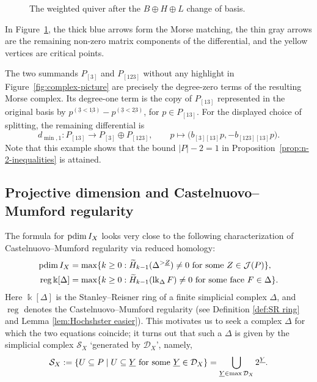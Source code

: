 \documentclass[a4paper,leqno]{amsart}
\begin{document}
\begin{eg}
\begin{figure}[htbp]
\caption{The weighted quiver after the $B\oplus H\oplus L$ change
of basis.}
\label{fig:morse-matching-change-of-basis}
\end{figure}

In Figure~\ref{fig:morse-matching-change-of-basis}, the thick blue arrows form the Morse matching, the thin gray arrows are the remaining non-zero matrix components of the differential, and the yellow vertices are critical points.

The two summands $P_{[3]}$ and $P_{[123]}$ without any highlight in Figure~\ref{fig:complex-picture} are precisely the degree-zero terms of the resulting Morse complex.  Its degree-one term is the copy of $P_{[13]}$ represented in the original basis by $p^{(\underline{3}<\underline{13})}-p^{(\underline{3}<\underline{23})}$, for $p\in P_{[13]}$. For the displayed choice of splitting, the remaining differential is
\[
 d_{\min,1}\colon P_{[13]}\longrightarrow P_{[3]}\oplus P_{[123]},
 \qquad
 p\longmapsto
 \bigl(b_{[3][13]}p,-b_{[123][13]}p\bigr).
\]
Note that this example shows that the bound $|P|-2=1$ in Proposition~\ref{prop:n-2-inequalities} is attained.
\end{eg}

\subsection{Projective dimension and Castelnuovo--Mumford regularity}\label{subsec:CM regularity}
The formula for $\operatorname{pdim} I_X$ looks very close to the following characterization of Castelnuovo--Mumford regularity via reduced homology:
\begin{align}
\operatorname{pdim} I_X
&=\max\{k\geq 0:\widetilde H_{k-1}(\Delta^{>\underline{Z}})\neq 0 \text{ for some }Z\in \mathcal{J}(P)\}, \\
\operatorname{reg}\Bbbk[\Delta]
&=\max\{k\geq 0:\widetilde H_{k-1}(\operatorname{lk}_\Delta F)\neq 0 \text{ for some face }F\in \Delta\}. \label{eq:reg=non-vanishing homology}
\end{align}
Here $\Bbbk[\Delta]$ is the Stanley--Reisner ring of a finite simplicial complex $\Delta$, and $\operatorname{reg}$ denotes the Castelnuovo--Mumford regularity (see Definition \ref{def:SR ring} and Lemma \ref{lem:Hochshster easier}). This motivates us to seek a complex $\Delta$ for which the two equations coincide; it turns out that such a $\Delta$ is given by the simplicial complex $\mathcal{S}_X$ `generated by $\mathcal{D}_X$', namely,\[
\mathcal S_X:=\{U\subseteq P \mid U\subseteq \underline{Y} \text{ for some }\underline{Y}\in\mathcal D_X\} = \bigcup_{\underline{Y}\in \max \mathcal D_X} 2^{\underline{Y}}.
\]
\end{document}
